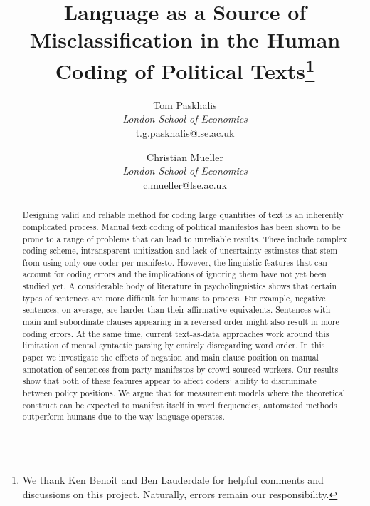\documentclass[a4paper, 12pt]{article}
\begin{document}
\setcounter{page}{0}

\title{Language as a Source of Misclassification in the Human Coding of Political Texts\footnote{We thank Ken Benoit and Ben Lauderdale for helpful comments and discussions on this project. Naturally, errors remain our responsibility.}}
\author{
  Tom Paskhalis\\ \textit{\small London School of Economics} \\ \href{mailto:t.g.paskhalis@lse.ac.uk}{\ttfamily\small t.g.paskhalis@lse.ac.uk}
  \and
  Christian Mueller\\ \textit{\small London School of Economics} \\ \href{mailto:c.mueller@lse.ac.uk}{\ttfamily\small c.mueller@lse.ac.uk}
}


\maketitle
\thispagestyle{empty}

\vspace{3em}

\begin{abstract}
\noindent Designing valid and reliable method for coding large quantities of text is an inherently complicated process. Manual text coding of political manifestos has been shown to be prone to a range of problems that can lead to unreliable results. These include complex coding scheme, intransparent unitization and lack of uncertainty estimates that stem from using only one coder per manifesto. However, the linguistic features that can account for coding errors and the implications of ignoring them have not yet been studied yet. A considerable body of literature in psycholinguistics shows that certain types of sentences are more difficult for humans to process. For example, negative sentences, on average, are harder than their affirmative equivalents. Sentences with main and subordinate clauses appearing in a reversed order might also result in more coding errors. At the same time, current text-as-data approaches work around this limitation of mental syntactic parsing by entirely disregarding word order. In this paper we investigate the effects of negation and main clause position on manual annotation of sentences from party manifestos by crowd-sourced workers. Our results show that both of these features appear to affect coders' ability to discriminate between policy positions. We argue that for measurement models where the theoretical construct can be expected to manifest itself in word frequencies, automated methods outperform humans due to the way language operates.
\end{abstract}
\end{document}
